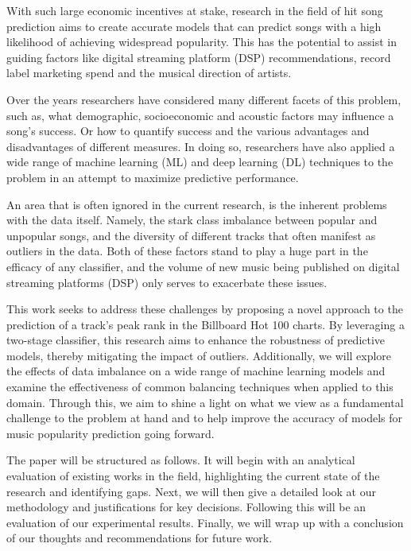 \documentclass[conference]{IEEEtran}
\begin{document}
With such large economic incentives at stake, research in the field of hit song prediction aims to create accurate models that can predict songs with a high likelihood of achieving widespread popularity. This has the potential to assist in guiding factors like digital streaming platform (DSP) recommendations, record label marketing spend and the musical direction of artists\cite{b3}\cite{b4}.

Over the years researchers have considered many different facets of this problem, such as, what demographic, socioeconomic and acoustic factors may influence a song's success\cite{b5}.
Or how to quantify success and the various advantages and disadvantages of different measures\cite{b3}.
In doing so, researchers have also applied a wide range of machine learning (ML) and deep learning (DL) techniques to the problem in an attempt to maximize predictive performance.

An area that is often ignored in the current research, is the inherent problems with the data itself. Namely, the stark class imbalance between popular and unpopular songs, and the diversity of different tracks that often manifest as outliers in the data. Both of these factors stand to play a huge part in the efficacy of any classifier, and the volume of new music being published on digital streaming platforms (DSP) only serves to  exacerbate these issues.

This work seeks to address these challenges by proposing a novel approach to the prediction of a track's peak rank in the Billboard Hot 100 charts\cite{b6}. By leveraging a two-stage classifier, this research aims to enhance the robustness of predictive models, thereby mitigating the impact of outliers. Additionally, we will explore the effects of data imbalance on a wide range of machine learning models and examine the effectiveness of common balancing techniques when applied to this domain. Through this, we aim to shine a light on what we view as a fundamental challenge to the problem at hand and to help improve the accuracy of models for music popularity prediction going forward.

The paper will be structured as follows. It will begin with an analytical evaluation of existing works in the field, highlighting the current state of the research and identifying gaps. Next, we will then give a detailed look at our methodology and justifications for key decisions. Following this will be an evaluation of our experimental results. Finally, we will wrap up with a conclusion of our thoughts and recommendations for future work.
\end{document}
